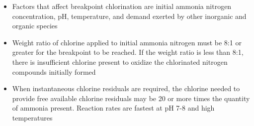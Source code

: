 \begin{itemize}
\begin{itemize}
			\end{itemize}
			\begin{itemize}
				\item Factors that affect breakpoint chlorination are initial ammonia nitrogen concentration, pH, temperature, and demand exerted by other inorganic and organic species
				\item Weight ratio of chlorine applied to initial ammonia nitrogen must be 8:1 or greater for the breakpoint to be reached. If the weight ratio is less than 8:1, there is insufficient chlorine present to oxidize the chlorinated nitrogen compounds initially formed
				\item When instantaneous chlorine residuals are required, the chlorine needed to provide free available chlorine residuals may be 20 or more times the quantity of ammonia present. Reaction rates are fastest at pH 7-8 and high temperatures
			\end{itemize}
						\end{itemize}
